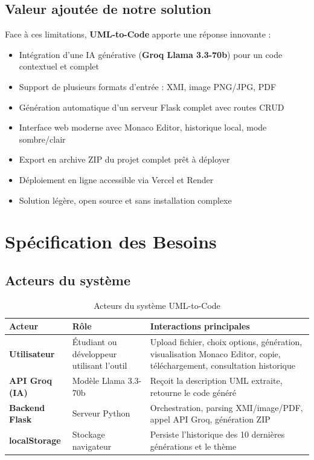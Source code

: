 \subsection{Valeur ajoutée de notre solution}

Face à ces limitations, \textbf{UML-to-Code} apporte une réponse innovante :
\begin{itemize}
    \item Intégration d'une IA générative (\textbf{Groq Llama 3.3-70b}) pour un code contextuel et complet
    \item Support de plusieurs formats d'entrée : XMI, image PNG/JPG, PDF
    \item Génération automatique d'un serveur Flask complet avec routes CRUD
    \item Interface web moderne avec Monaco Editor, historique local, mode sombre/clair
    \item Export en archive ZIP du projet complet prêt à déployer
    \item Déploiement en ligne accessible via Vercel\fnVercel{} et Render\fnRender
    \item Solution légère, open source et sans installation complexe
\end{itemize}

\section{Spécification des Besoins}

\subsection{Acteurs du système}

\begin{table}[htbp]
\centering
\renewcommand{\arraystretch}{1.4}
\begin{tabular}{|l|p{4cm}|p{6cm}|}
\hline
\rowcolor{gray!30}
\textbf{Acteur} & \textbf{Rôle} & \textbf{Interactions principales} \\
\hline
\textbf{Utilisateur} & Étudiant ou développeur utilisant l'outil & Upload fichier, choix options, génération, visualisation Monaco Editor, copie, téléchargement, consultation historique \\
\hline
\textbf{API Groq (IA)} & Modèle Llama 3.3-70b & Reçoit la description UML extraite, retourne le code généré \\
\hline
\textbf{Backend Flask} & Serveur Python & Orchestration, parsing XMI/image/PDF, appel API Groq, génération ZIP \\
\hline
\textbf{localStorage} & Stockage navigateur & Persiste l'historique des 10 dernières générations et le thème \\
\hline
\end{tabular}
\caption{Acteurs du système UML-to-Code}
\end{table}

